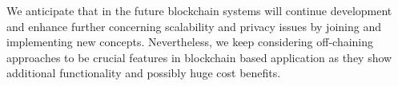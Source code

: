 We anticipate that in the future blockchain systems will continue development and enhance further concerning scalability and privacy issues by joining and implementing new concepts. Nevertheless, we keep considering off-chaining approaches to be crucial features in blockchain based application as they show additional functionality and possibly huge cost benefits.


\newpage
